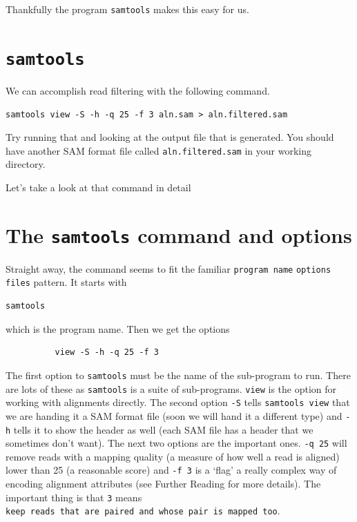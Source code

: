 \documentclass[]{book}
\begin{document}
Thankfully the program \texttt{samtools} makes this easy for us.

\hypertarget{samtools}{%
\section{\texorpdfstring{\texttt{samtools}}{samtools}}\label{samtools}}

We can accomplish read filtering with the following command.

\begin{verbatim}
samtools view -S -h -q 25 -f 3 aln.sam > aln.filtered.sam
\end{verbatim}

Try running that and looking at the output file that is generated. You should have another SAM format file called \texttt{aln.filtered.sam} in your working directory.

Let's take a look at that command in detail

\hypertarget{the-samtools-command-and-options}{%
\section{\texorpdfstring{The \texttt{samtools} command and options}{The samtools command and options}}\label{the-samtools-command-and-options}}

Straight away, the command seems to fit the familiar \texttt{program\ name} \texttt{options} \texttt{files} pattern. It starts with

\begin{verbatim}
samtools
\end{verbatim}

which is the program name. Then we get the options

\begin{verbatim}
          view -S -h -q 25 -f 3
\end{verbatim}

The first option to \texttt{samtools} must be the name of the sub-program to run. There are lots of these as \texttt{samtools} is a suite of sub-programs. \texttt{view} is the option for working with alignments directly. The second option \texttt{-S} tells \texttt{samtools\ view} that we are handing it a SAM format file (soon we will hand it a different type) and \texttt{-h} tells it to show the header as well (each SAM file has a header that we sometimes don't want). The next two options are the important ones. \texttt{-q\ 25} will remove reads with a mapping quality (a measure of how well a read is aligned) lower than 25 (a reasonable score) and \texttt{-f\ 3} is a `flag' a really complex way of encoding alignment attributes (see Further Reading for more details). The important thing is that \texttt{3} means \texttt{keep\ reads\ that\ are\ paired\ and\ whose\ pair\ is\ mapped\ too}.
\end{document}
